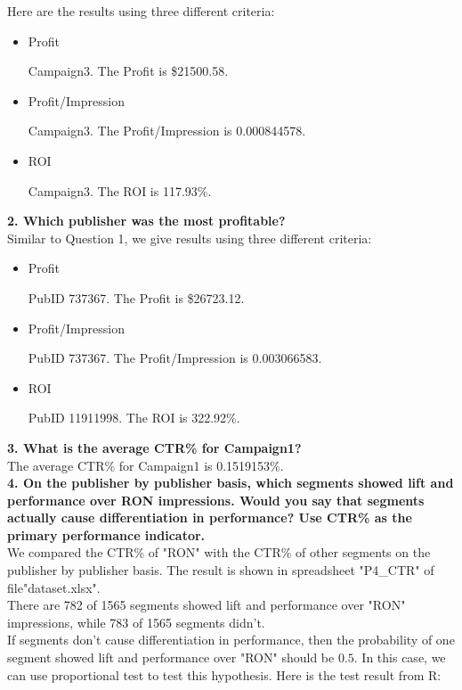 \documentclass[12pt]{article}
\begin{document}
Here are the results using three different criteria:

\begin{itemize}
\item Profit

	Campaign3. The Profit is \$21500.58.
\item Profit/Impression

	Campaign3. The Profit/Impression is 0.000844578.
\item ROI

	Campaign3. The ROI is 117.93\%.
\end{itemize}

{\bf 2. Which publisher was the most profitable?} \\

Similar to Question 1, we give results using three different criteria:

\begin{itemize}
\item Profit

	PubID 737367. The Profit is \$26723.12.
\item Profit/Impression

	PubID 737367. The Profit/Impression is 0.003066583.
\item ROI

	PubID 11911998. The ROI is 322.92\%.
\end{itemize}

{\bf 3. What is the average CTR\% for Campaign1?} \\

The average CTR\% for Campaign1 is 0.1519153\%. \\

{\bf 4. On the publisher by publisher basis, which segments showed lift and performance over RON impressions. Would you say that segments actually cause differentiation in performance? Use CTR\% as the primary performance indicator.} \\

We compared the CTR\% of "RON" with the CTR\% of other segments on the publisher by publisher basis. The result is shown in spreadsheet "P4\_CTR" of file"dataset.xlsx". \\

There are 782 of 1565 segments showed lift and performance over "RON" impressions, while 783 of 1565 segments didn't. \\

If segments don't cause differentiation in performance, then the probability of one segment showed lift and performance over "RON" should be $0.5$. In this case, we can use proportional test to test this hypothesis. Here is the test result from R:
\end{document}
